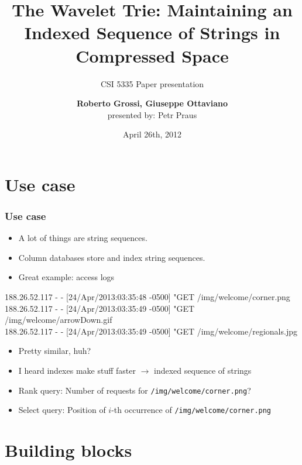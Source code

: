 \documentclass{beamer}
\title[The Wavelet Trie]{The Wavelet Trie: Maintaining an Indexed Sequence of
Strings in Compressed Space}
\subtitle{CSI 5335 Paper presentation}
\author[Roberto Grossi, Giuseppe Ottaviano]{{\bf Roberto Grossi, Giuseppe
Ottaviano}\\
presented by: Petr Praus}
\date{April 26th, 2012}
\newenvironment{changemargin}[2]{%
  \begin{list}{}{%
    \setlength{\topsep}{0pt}%
    \setlength{\leftmargin}{#1}%
    \setlength{\rightmargin}{#2}%
    \setlength{\listparindent}{\parindent}%
    \setlength{\itemindent}{\parindent}%
    \setlength{\parsep}{\parskip}%
  }%
  \item[]}{\end{list}}
\begin{document}
\begin{frame}
\titlepage
\end{frame}

\section{Use case}

\begin{frame}
\frametitle{Use case}
\begin{itemize}
  \item A lot of things are string sequences.
  \item Column databases store and index string sequences.
  \item Great example: access logs
\end{itemize}
\vspace{10pt}
{\scriptsize
188.26.52.117 - - [24/Apr/2013:03:35:48 -0500] "GET /img/welcome/corner.png\\
188.26.52.117 - - [24/Apr/2013:03:35:49 -0500] "GET /img/welcome/arrowDown.gif\\
188.26.52.117 - - [24/Apr/2013:03:35:49 -0500] "GET /img/welcome/regionals.jpg\\
}
\vspace{10pt}
\begin{changemargin}{-15pt}{-15pt}
\begin{itemize}
  \item Pretty similar, huh?
  \item I heard indexes make stuff faster $\rightarrow$ indexed sequence of strings
  \item Rank query: Number of requests for \texttt{/img/welcome/corner.png}?
  \item Select query: Position of $i$-th occurrence of \texttt{/img/welcome/corner.png}
\end{itemize}
\end{changemargin}
\end{frame}


\section{Building blocks}
\end{document}

